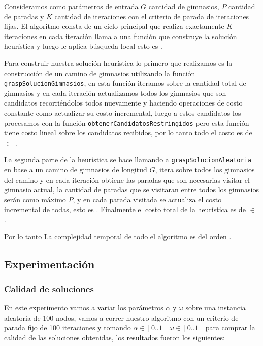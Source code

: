 Consideramos como parámetros de entrada $G$ cantidad de gimnasios, $P$ cantidad de paradas y $K$ cantidad de iteraciones con el criterio de parada de iteraciones fijas.
El algoritmo consta de un ciclo principal que realiza exactamente $K$ iteraciones en cada iteración llama a una función que construye la solución heurística y luego le aplica búsqueda local esto es . 

Para construir nuestra solución heurística lo primero que realizamos es la construcción de un camino de gimnasios utilizando la función \texttt{graspSolucionGimnasios}, en esta función iteramos sobre la cantidad total de gimnasios y en cada iteración actualizamos todos los gimnasios que son candidatos recorriéndolos todos nuevamente y haciendo operaciones de costo constante como actualizar su costo incremental, luego a estos candidatos los procesamos con la función \texttt{obtenerCandidatosRestringidos} pero esta función tiene costo lineal sobre los candidatos recibidos, por lo tanto todo el costo es de  $\in$ .

La segunda parte de la heurística se hace llamando a \texttt{graspSolucionAleatoria} en base a un camino de gimnasios de longitud $G$, itera sobre todos los gimnasios del camino y en cada iteración obtiene las paradas que son necesarias visitar el gimnasio actual, la cantidad de paradas que se visitaran entre todos los gimnasios serán como máximo $P$, y en cada parada visitada se actualiza el costo incremental de todas, esto es . Finalmente el costo total de la heurística es de  $\in$ .

Por lo tanto La complejidad temporal de todo el algoritmo es del orden .

\subsection{Experimentación}

\subsubsection{Calidad de soluciones}

En este experimento vamos a variar los parámetros $\alpha$ y  $\omega$ sobre una instancia aleatoria de 100 nodos, vamos a correr nuestro algoritmo con un criterio de parada fijo de 100 iteraciones y tomando $\alpha \in [0..1]$ $\omega \in [0..1]$ para comprar la calidad de las soluciones obtenidas, los resultados fueron los siguientes:

